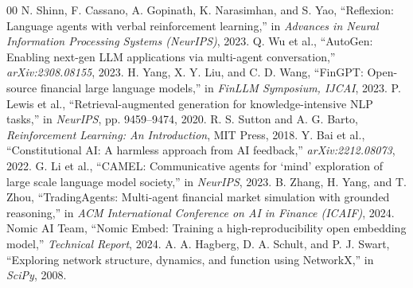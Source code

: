 \documentclass[conference]{IEEEtran}
\begin{document}
\begin{thebibliography}{00}
 N. Shinn, F. Cassano, A. Gopinath, K. Narasimhan, and S. Yao, ``Reflexion: Language agents with verbal reinforcement learning,'' in \textit{Advances in Neural Information Processing Systems (NeurIPS)}, 2023.
 Q. Wu et al., ``AutoGen: Enabling next-gen LLM applications via multi-agent conversation,'' \textit{arXiv:2308.08155}, 2023.
 H. Yang, X. Y. Liu, and C. D. Wang, ``FinGPT: Open-source financial large language models,'' in \textit{FinLLM Symposium, IJCAI}, 2023.
 P. Lewis et al., ``Retrieval-augmented generation for knowledge-intensive NLP tasks,'' in \textit{NeurIPS}, pp. 9459--9474, 2020.
 R. S. Sutton and A. G. Barto, \textit{Reinforcement Learning: An Introduction}, MIT Press, 2018.
 Y. Bai et al., ``Constitutional AI: A harmless approach from AI feedback,'' \textit{arXiv:2212.08073}, 2022.
 G. Li et al., ``CAMEL: Communicative agents for `mind' exploration of large scale language model society,'' in \textit{NeurIPS}, 2023.
 B. Zhang, H. Yang, and T. Zhou, ``TradingAgents: Multi-agent financial market simulation with grounded reasoning,'' in \textit{ACM International Conference on AI in Finance (ICAIF)}, 2024.
 Nomic AI Team, ``Nomic Embed: Training a high-reproducibility open embedding model,'' \textit{Technical Report}, 2024.
 A. A. Hagberg, D. A. Schult, and P. J. Swart, ``Exploring network structure, dynamics, and function using NetworkX,'' in \textit{SciPy}, 2008.
\end{thebibliography}
\end{document}
